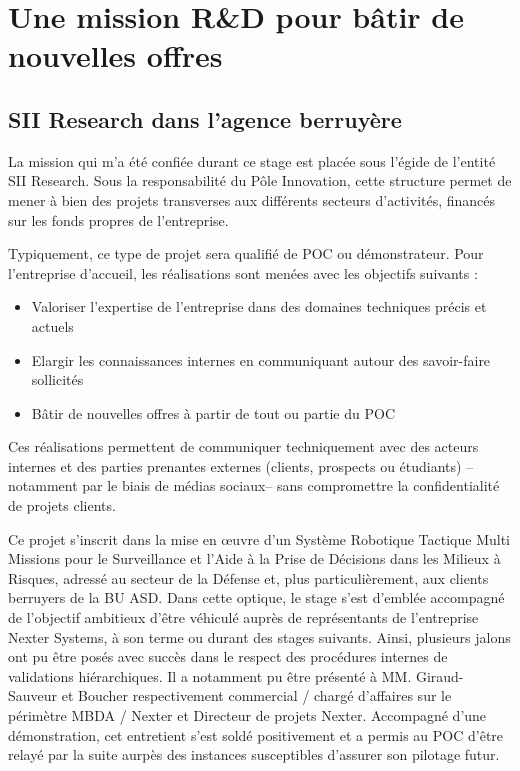 \section{Une mission R\&D pour b\^{a}tir de nouvelles offres}

\subsection{SII Research dans l'agence berruyère}

La mission qui m'a été confiée durant ce stage est placée sous l'égide de l'entité SII Research. 
Sous la responsabilité du Pôle Innovation, cette structure permet de mener à bien des projets transverses aux différents secteurs d'activités, financés sur les fonds propres de l'entreprise.  

Typiquement, ce type de projet sera qualifié de \gls{POC} ou démonstrateur. Pour l'entreprise d'accueil, les réalisations sont menées avec les objectifs suivants : 

\begin{itemize}
  \item Valoriser l'expertise de l'entreprise dans des domaines techniques précis et actuels
  \item Elargir les connaissances internes en communiquant autour des savoir-faire sollicités
  \item Bâtir de nouvelles offres à partir de tout ou partie du \gls{POC} 
\end{itemize}

Ces réalisations permettent de communiquer techniquement avec des acteurs internes et des parties prenantes externes (clients, prospects ou étudiants) --notamment par le biais de médias sociaux-- sans compromettre la confidentialité 
de projets clients. 

Ce projet s’inscrit dans la mise en \oe{}uvre d’un Système Robotique Tactique Multi Missions pour le Surveillance et l’Aide à la Prise de Décisions dans les Milieux à Risques, adressé au secteur de la Défense 
et, plus particulièrement, aux clients berruyers de la \gls{BU} \gls{ASD}.
Dans cette optique, le stage s'est d'emblée accompagné de l'objectif ambitieux d'être véhiculé auprès de représentants de l'entreprise Nexter Systems, à son terme ou durant des stages suivants.  
Ainsi, plusieurs jalons ont pu être posés avec succès dans le respect des procédures internes de validations hiérarchiques. 
Il a notamment pu être présenté à MM. Giraud-Sauveur et Boucher respectivement commercial / chargé d'affaires sur le périmètre MBDA / Nexter et Directeur de projets Nexter. 
Accompagné d'une démonstration, cet entretient s'est soldé positivement et a permis au \gls{POC} d'être relayé par la suite aurpès des instances susceptibles d'assurer son pilotage futur.  

